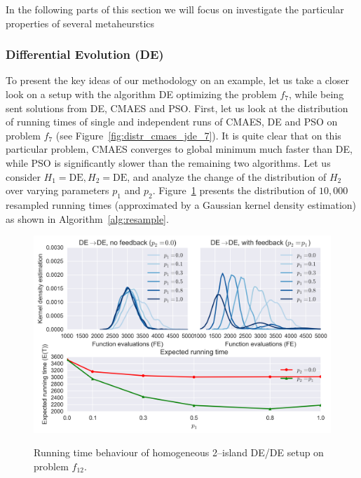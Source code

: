 \documentclass{sig-alternate}
\begin{document}
In the following parts of this section we will focus on investigate the particular properties of several metaheurstics 

\subsubsection{Differential Evolution (DE)}


To present the key ideas of our methodology on an example, let us take a closer look on a setup with the algorithm DE optimizing the problem $f_7$, while being sent solutions from DE, CMAES and PSO.
First, let us look at the distribution of running times of single and independent runs of CMAES, DE and PSO on problem $f_7$ (see Figure~\ref{fig:distr_cmaes_jde_7}).
It is quite clear that on this particular problem, CMAES converges to global minimum much faster than DE, while PSO is significantly slower than the remaining two algorithms.
Let us consider $H_1 = \mbox{DE}, H_2 = \mbox{DE}$, and analyze the change of the distribution of $H_2$ over varying parameters $p_1$ and $p_2$.
Figure~\ref{fig:single_jde_jde_7} presents the distribution of $10,000$ resampled running times (approximated by a Gaussian kernel density estimation) as shown in Algorithm~\ref{alg:resample}.
\begin{figure}[ht]
  \centering
  \includegraphics[width=\columnwidth]{figures/single_jde_jde_cec_7.png}
  \label{fig:single_jde_jde_7}
 \caption{Running time behaviour of homogeneous 2--island DE/DE setup on problem $f_{12}$.}
\end{figure}
\end{document}
